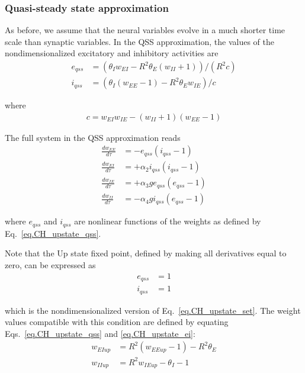 \documentclass[
twocolumn,
]{article}
\newcommand{\EE}{\mathit{EE}}
\newcommand{\EI}{\mathit{EI}}
\newcommand{\IE}{\mathit{IE}}
\newcommand{\II}{\mathit{II}}
\newcommand{\up}{\mathit{up}}
\newcommand{\qss}{\mathit{qss}}
\begin{document}
\subsubsection{Quasi-steady state approximation}

As before, we assume that the neural variables evolve in a much shorter time scale than synaptic variables. In the QSS approximation, the values of the nondimensionalized excitatory and inhibitory activities are
\begin{equation}
\begin{aligned}
e_{\qss} & = (\theta_I w_{\EI} - R^2\theta_E(w_{\II} + 1))/(R^2c) \\
i_{\qss} & = (\theta_I (w_{\EE} - 1) - R^2 \theta_E w_{\IE})/c
\end{aligned}
\label{eq.CH_upstate_qss}
\end{equation}

\noindent where
\begin{displaymath}
\begin{aligned}
c = w_{\EI} w_{\IE} - (w_{\II} + 1)(w_{\EE} - 1)
\end{aligned}
\end{displaymath}

The full system in the QSS approximation reads
\begin{equation}
\begin{aligned}
\frac{dw_{\EE}}{d\tau} & = -e_{\qss}(i_{\qss} - 1) \\
\frac{dw_{\EI}}{d\tau} & = +\alpha_2 i_{\qss}(i_{\qss} - 1) \\
\frac{dw_{\IE}}{d\tau} & = +\alpha_3 g e_{\qss}(e_{\qss}-1) \\
\frac{dw_{\II}}{d\tau} & = -\alpha_4 g i_{\qss}(e_{\qss}-1)
\end{aligned}
\label{eq.CH_full_norm_qss}
\end{equation}

\noindent where $e_{\qss}$ and $i_{\qss}$ are nonlinear functions of the weights as defined by Eq.\ \ref{eq.CH_upstate_qss}.

Note that the Up state fixed point, defined by making all derivatives equal to zero, can be expressed as
\begin{equation}
\begin{aligned}
e_{\qss} & = 1 \\
i_{\qss} & = 1
\end{aligned}
\label{eq.CH_upstate_ei}
\end{equation}

\noindent which is the nondimensionalized version of Eq.\ \ref{eq.CH_upstate_set}. The weight values compatible with this condition are defined by equating Eqs.\ \ref{eq.CH_upstate_qss} and \ref{eq.CH_upstate_ei}:
\begin{equation}
\begin{aligned}
w_{\EI\up} & = R^2 (w_{\EE\up} - 1) - R^2\theta_E \\
w_{\II\up} & = R^2 w_{\IE\up} - \theta_I - 1
\end{aligned}
\label{eq.CH_upstate_w}
\end{equation}
\end{document}
